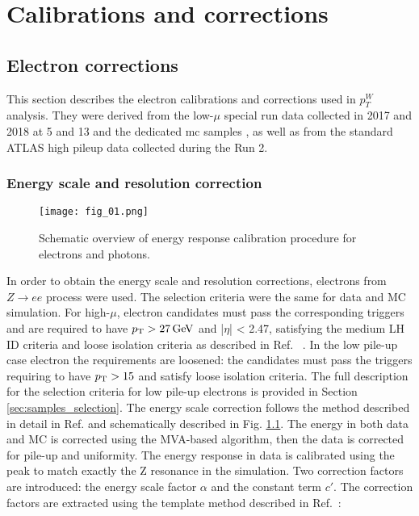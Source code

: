 \chapter{Calibrations and corrections}
    
    \section{Electron corrections}
    This section describes the electron calibrations and corrections used in $p_T^W$ analysis. They were derived from the low-$\mu$ special run data collected in 2017 and 2018 at 5 and 13 \tev{} and the dedicated \gls{mc} samples \cite{Kretzschmar:2657141}, as well as from the standard ATLAS high pileup data collected during the Run 2.
    \subsection{Energy scale and resolution correction}
        \begin{figure}[H]
    	\centering
    	\texttt{[image: fig\_01.png]}
    	\caption{Schematic overview of energy response calibration procedure for electrons and photons.}
    	\label{fig:calibrationChain}
    \end{figure}
    In order to obtain the energy scale and resolution corrections, electrons from $Z\rightarrow ee$ process were used. The selection criteria were the same for data and MC simulation. For high-$\mu$, electron candidates must pass the corresponding triggers and are required to have $p_{\text{T}} > 27\,\text{Ge\kern -0.1em V}$ and |$\eta$| < 2.47, satisfying the medium LH ID criteria and loose isolation criteria as described in Ref. ~\cite{Aaboud:2018ugz}. In the low pile-up case electron the requirements are loosened: the candidates must pass the triggers requiring to have $p_{\text{T}} > 15$ and satisfy loose isolation criteria. The full description for the selection criteria for low pile-up electrons is provided in Section \ref{sec:samples_selection}.
    The energy scale correction follows the method described in detail in Ref. \cite{egamma_perf_2017} and schematically described in Fig. \ref{fig:calibrationChain}. The energy in both data and MC is corrected using the MVA-based algorithm, then the data is corrected for pile-up and uniformity. The energy response in data is calibrated using the \Zee peak to match exactly the Z resonance in the simulation. Two correction factors are introduced: the energy scale factor $\alpha$ and the constant term $c'$. The correction factors are extracted using the template method described in Ref.~\cite{PERF-2013-05}:
